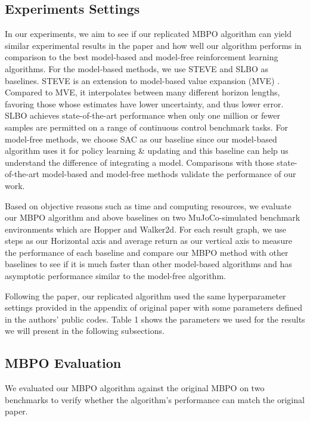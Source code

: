 \subsection{Experiments Settings}

In our experiments, we aim to see if our replicated MBPO algorithm can yield similar experimental results in the paper and how well our algorithm performs in comparison to the best model-based and model-free reinforcement learning algorithms. For the model-based methods, we use STEVE and SLBO as baselines. STEVE is an extension to model-based value expansion (MVE) \cite{ref11}. Compared to MVE, it interpolates between many different horizon lengths, favoring those whose estimates have lower uncertainty, and thus lower error. SLBO achieves state-of-the-art performance when only one million or fewer samples are permitted on a range of continuous control benchmark tasks. For model-free methods, we choose SAC as our baseline since our model-based algorithm uses it for policy learning \& updating and this baseline can help us understand the difference of integrating a model. Comparisons with those state-of-the-art model-based and model-free methods validate the performance of our work.

Based on objective reasons such as time and computing resources, we evaluate our MBPO algorithm and above baselines on two MuJoCo-simulated benchmark environments which are Hopper and Walker2d. For each result graph, we use steps as our Horizontal axis and average return as our vertical axis to measure the performance of each baseline and compare our MBPO method with other baselines to see if it is much faster than other model-based algorithms and has asymptotic performance similar to the model-free algorithm.

Following the paper, our replicated algorithm used the same hyperparameter settings provided in the appendix of original paper with some parameters defined in the authors' public codes. Table 1 shows the parameters we used for the results we will present in the following subsections.

\subsection{MBPO Evaluation}
We evaluated our MBPO algorithm against the original MBPO on two benchmarks to verify whether the algorithm's performance can match the original paper.  

